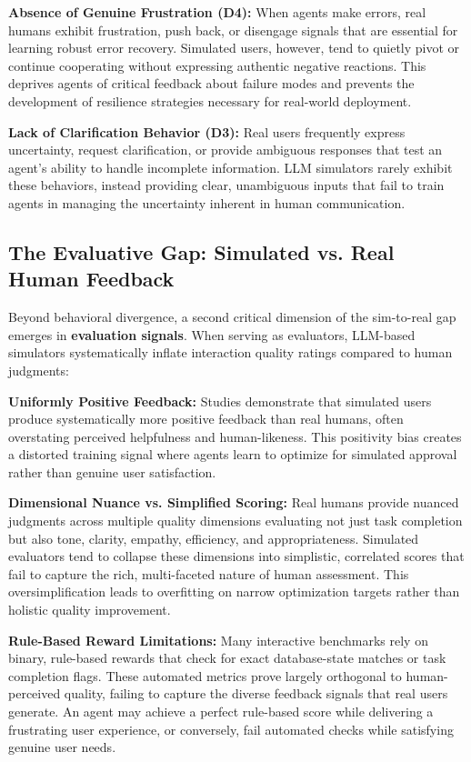 \textbf{Absence of Genuine Frustration (D4):} When agents make errors, real humans exhibit frustration, push back, or disengage signals that are essential for learning robust error recovery. Simulated users, however, tend to quietly pivot or continue cooperating without expressing authentic negative reactions. This deprives agents of critical feedback about failure modes and prevents the development of resilience strategies necessary for real-world deployment.

\textbf{Lack of Clarification Behavior (D3):} Real users frequently express uncertainty, request clarification, or provide ambiguous responses that test an agent's ability to handle incomplete information. LLM simulators rarely exhibit these behaviors, instead providing clear, unambiguous inputs that fail to train agents in managing the uncertainty inherent in human communication.

\subsection{The Evaluative Gap: Simulated vs. Real Human Feedback}

Beyond behavioral divergence, a second critical dimension of the sim-to-real gap emerges in \textbf{evaluation signals}. When serving as evaluators, LLM-based simulators systematically inflate interaction quality ratings compared to human judgments:

\textbf{Uniformly Positive Feedback:} Studies demonstrate that simulated users produce systematically more positive feedback than real humans, often overstating perceived helpfulness and human-likeness. This positivity bias creates a distorted training signal where agents learn to optimize for simulated approval rather than genuine user satisfaction.

\textbf{Dimensional Nuance vs. Simplified Scoring:} Real humans provide nuanced judgments across multiple quality dimensions evaluating not just task completion but also tone, clarity, empathy, efficiency, and appropriateness. Simulated evaluators tend to collapse these dimensions into simplistic, correlated scores that fail to capture the rich, multi-faceted nature of human assessment. This oversimplification leads to overfitting on narrow optimization targets rather than holistic quality improvement.

\textbf{Rule-Based Reward Limitations:} Many interactive benchmarks rely on binary, rule-based rewards that check for exact database-state matches or task completion flags. These automated metrics prove largely orthogonal to human-perceived quality, failing to capture the diverse feedback signals that real users generate. An agent may achieve a perfect rule-based score while delivering a frustrating user experience, or conversely, fail automated checks while satisfying genuine user needs.

